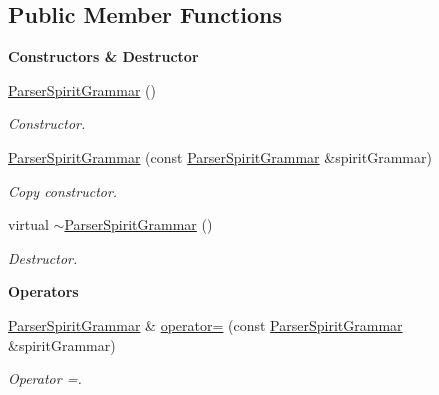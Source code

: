 \subsection*{Public Member Functions}
\begin{Indent}\textbf{ Constructors \& Destructor}\par
\begin{DoxyCompactItemize}
\item 
\mbox{\label{classLifeV_1_1ParserSpiritGrammar_afd12d0ca36622930f0c5e574c96acaa7}} 
\hyperlink{classLifeV_1_1ParserSpiritGrammar_afd12d0ca36622930f0c5e574c96acaa7}{Parser\+Spirit\+Grammar} ()
\begin{DoxyCompactList}\small\item\em Constructor. \end{DoxyCompactList}\item 
\hyperlink{classLifeV_1_1ParserSpiritGrammar_a2a0d8a4396ae61a66edc4f320d9e79f5}{Parser\+Spirit\+Grammar} (const \hyperlink{classLifeV_1_1ParserSpiritGrammar}{Parser\+Spirit\+Grammar} \&spirit\+Grammar)
\begin{DoxyCompactList}\small\item\em Copy constructor. \end{DoxyCompactList}\item 
\mbox{\label{classLifeV_1_1ParserSpiritGrammar_a32c0629e6ee7ea37bb0b3159b0fa31ee}} 
virtual \hyperlink{classLifeV_1_1ParserSpiritGrammar_a32c0629e6ee7ea37bb0b3159b0fa31ee}{$\sim$\+Parser\+Spirit\+Grammar} ()
\begin{DoxyCompactList}\small\item\em Destructor. \end{DoxyCompactList}\end{DoxyCompactItemize}
\end{Indent}
\begin{Indent}\textbf{ Operators}\par
\begin{DoxyCompactItemize}
\item 
\hyperlink{classLifeV_1_1ParserSpiritGrammar}{Parser\+Spirit\+Grammar} \& \hyperlink{classLifeV_1_1ParserSpiritGrammar_a6ce4fa32aacdc3bc7e4b38be901f94cf}{operator=} (const \hyperlink{classLifeV_1_1ParserSpiritGrammar}{Parser\+Spirit\+Grammar} \&spirit\+Grammar)
\begin{DoxyCompactList}\small\item\em Operator =. \end{DoxyCompactList}\end{DoxyCompactItemize}
\end{Indent}
